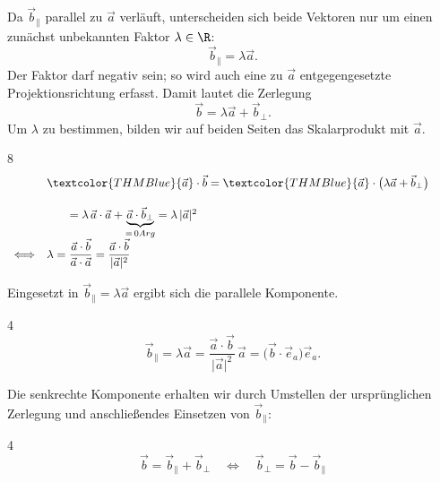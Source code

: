 Da $\vec b_{\parallel}$ parallel zu $\vec a$ verläuft, unterscheiden sich beide Vektoren nur
um einen zunächst unbekannten Faktor $\lambda\in\R$:
\[
  \vec b_{\parallel}=\lambda\vec a.
\]
Der Faktor darf negativ sein; so wird auch eine zu
$\vec a$ entgegengesetzte Projektionsrichtung erfasst.
Damit lautet die Zerlegung
\[
  \vec b=\lambda\vec a+\vec b_{\perp}.
\]
Um $\lambda$ zu bestimmen, bilden wir auf beiden Seiten das Skalarprodukt mit
$\vec a$.
\begin{ClozeArea}[34]{8}
  \[
    \begin{array}{r@{\quad}l@{\qquad}l}
      \phantom{\Longleftrightarrow}
      & \textcolor{THMBlue}{\vec a}\cdot\vec b
        =\textcolor{THMBlue}{\vec a}\cdot
          \bigl(\lambda\vec a+\vec b_{\perp}\bigr)
      & \\[1.4em]
      \phantom{\Longleftrightarrow}
      & \phantom{\vec a\cdot\vec b}
        =\lambda\,\vec a\cdot\vec a
          +\underbrace{
            \vec a\cdot\vec b_{\perp}
          }_{=\,0Arg}
        =\lambda\,\lvert\vec a\rvert^2
      & \\[1.4em]
      \Longleftrightarrow
      & \lambda
        =\dfrac{\vec a\cdot\vec b}{\vec a\cdot\vec a}
        =\dfrac{\vec a\cdot\vec b}{\lvert\vec a\rvert^2}
      &
    \end{array}
  \]
\end{ClozeArea}
Eingesetzt in $\vec b_{\parallel}=\lambda\vec a$ ergibt sich die parallele Komponente.
\begin{ClozeArea}[34]{4}
  \[
    \vec b_{\parallel}
      =\lambda\vec a
      =\frac{\vec a\cdot\vec b}{\lvert\vec a\rvert^2}\,\vec a
      =\bigl(\vec b\cdot\vec e_a\bigr)\vec e_a.
  \]
\end{ClozeArea}

Die senkrechte Komponente erhalten wir durch Umstellen der ursprünglichen
Zerlegung und anschließendes Einsetzen von $\vec b_{\parallel}$:
\begin{ClozeArea}[34]{4}
  \[
    \vec b=\vec b_{\parallel}+\vec b_{\perp}
      \quad\Longleftrightarrow\quad
    \vec b_{\perp}
      =\vec b-\vec b_{\parallel}
  \]
\end{ClozeArea}

